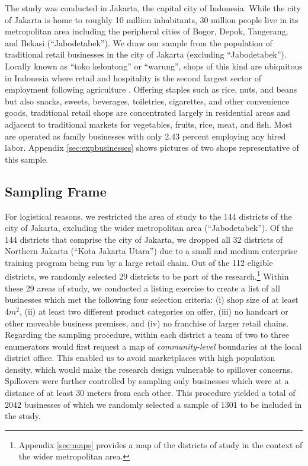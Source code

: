\documentclass[11.5pt]{article}
\begin{document}
The study was conducted in Jakarta, the capital city of Indonesia. While the city of Jakarta is home to roughly 10 million inhabitants, 30 million people live in its metropolitan area including the peripheral cities of Bogor, Depok, Tangerang, and Bekasi (``Jabodetabek''). We draw our sample from the population of traditional retail businesses in the city of Jakarta (excluding ``Jabodetabek''). Locally known as ``toko kelontong'' or ``warung'', shops of this kind are ubiquitous in Indonesia where retail and hospitality is the second largest sector of employment following agriculture \citep{StatistikUMKM2011}. Offering staples such as rice, nuts, and beans but also snacks, sweets, beverages, toiletries, cigarettes, and other convenience goods, traditional retail shops are concentrated largely in residential areas and adjacent to traditional markets for vegetables, fruits, rice, meat, and fish. Most are operated as family businesses with only 2.43 percent employing any hired labor. Appendix \ref{sec:expbusinesses} shows pictures of two shops representative of this sample.


\subsection{Sampling Frame}

For logistical reasons, we restricted the area of study to the 144 districts of the city of Jakarta, excluding the wider metropolitan area (``Jabodetabek''). Of the 144 districts that comprise the city of Jakarta, we dropped all 32 districts of Northern Jakarta (``Kota Jakarta Utara'') due to a small and medium enterprise training program being run by a large retail chain. Out of the 112 eligible districts, we randomly selected 29 districts to be part of the research.\footnote{Appendix \ref{sec:maps} provides a map of the districts of study in the context of the wider metropolitan area.} Within these 29 areas of study, we conducted a listing exercise to create a list of all businesses which met the following four selection criteria: (i) shop size of at least $4m^2$, (ii) at least two different product categories on offer, %
(iii) no handcart or other moveable business premises, and (iv) no franchise of larger retail chains. Regarding the sampling procedure, within each district a team of two to three enumerators would first request a map of \textit{community-level} boundaries at the local district office. This enabled us to avoid marketplaces with high population density, which would make the research design vulnerable to spillover concerns. Spillovers were further controlled by sampling only businesses which were at a distance of at least 30 meters from each other. This procedure yielded a total of 2042 businesses of which we randomly selected a sample of 1301 to be included in the study.
\end{document}
